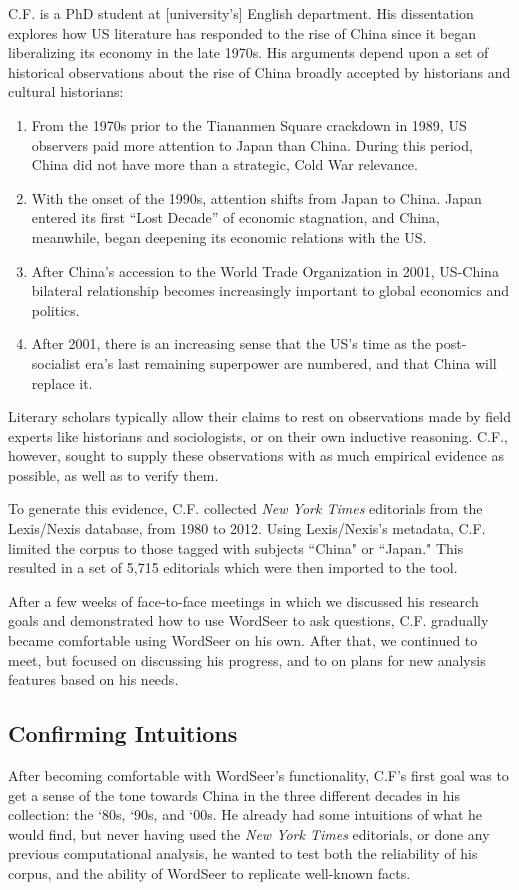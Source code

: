 \documentclass{sig-alternate}
\begin{document}
C.F. is a PhD student at [university's] English department. His dissentation explores how US literature has responded to the rise of China since it began liberalizing its economy in the late 1970s.  His arguments depend upon a set of historical observations about the rise of China  broadly accepted by historians and cultural historians: 
\begin{enumerate}
\item From the 1970s prior to the Tiananmen Square crackdown in 1989, US observers paid more attention to Japan than China. During this period, China did not have  more than a strategic, Cold War relevance. 
\item With the onset of the 1990s, attention shifts from Japan to China. Japan entered its first ``Lost Decade'' of economic stagnation, and China, meanwhile, began deepening its economic relations with the US.
\item After China's accession to the World Trade Organization in 2001, US-China bilateral relationship becomes increasingly important to global economics and politics.
\item After 2001, there is an increasing sense that the US's time as the post-socialist era's last remaining superpower are numbered, and that China will replace it.
\end{enumerate}
Literary scholars typically allow their claims to rest on observations made by field experts like historians and sociologists, or on their own inductive reasoning. C.F., however, sought to supply these observations with as much empirical evidence as possible, as well as to verify them.

To generate this evidence, C.F. collected \emph{New York Times} editorials from  the Lexis/Nexis database, from 1980 to 2012. Using Lexis/Nexis's metadata, C.F. limited the corpus to those tagged with subjects ``China" or ``Japan." This resulted in a set of 5,715 editorials which were then imported to the tool.

After a few weeks of face-to-face meetings in which we discussed his research goals and demonstrated how to use WordSeer to ask questions, C.F. gradually became comfortable using WordSeer on his own. After that, we continued to meet, but focused on discussing his progress, and to on plans for new analysis features based on his needs.


\subsection{Confirming Intuitions}
After becoming comfortable with WordSeer's functionality, C.F's first goal was to get a sense of the tone towards China in the three different decades in his collection: the `80s, `90s, and `00s.  He already had some intuitions of what he would find, but never having used the \emph{New York Times} editorials, or done any previous computational analysis, he wanted to test both the reliability of his corpus, and the ability of WordSeer to replicate well-known facts.
\end{document}
